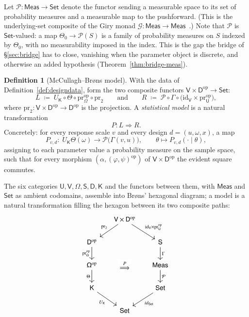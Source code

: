 \documentclass[11pt,a4paper]{article}
\theoremstyle{plain}
\theoremstyle{definition}
\newtheorem{definition}[theorem]{Definition}
\theoremstyle{remark}
\newcommand{\cat}[1]{\mathsf{#1}}
\newcommand{\catU}{\cat{U}}
\newcommand{\catV}{\cat{V}}
\newcommand{\catO}{\cat{\Omega}}
\newcommand{\catS}{\cat{S}}
\newcommand{\catD}{\cat{D}}
\newcommand{\catK}{\cat{K}}
\newcommand{\Meas}{\cat{Meas}}
\newcommand{\Set}{\cat{Set}}
\newcommand{\G}{\mathcal{G}}
\newcommand{\Prb}{\mathcal{P}}
\newcommand{\op}{\mathrm{op}}
\newcommand{\id}{\mathrm{id}}
\newcommand{\pr}{\mathrm{pr}}
\begin{document}
Let $\Prb \colon \Meas \to \Set$ denote the functor sending a measurable space
to its set of probability measures and a measurable map to the pushforward.
(This is the underlying-set composite of the Giry monad
$\G \colon \Meas \to \Meas$~\cite{giry_categorical_1982}.) Note that $\Prb$ is
$\Set$-valued: a map $\Theta_0 \to \Prb(S)$ is a family of probability
measures on $S$ indexed by $\Theta_0$, with no measurability imposed in the
index. This is the gap the bridge of \S\ref{sec:bridge} has to close,
vanishing when the parameter object is discrete, and otherwise an added
hypothesis (Theorem~\ref{thm:bridge-meas}).

\begin{definition}[McCullagh--Br\o ns model]\label{def:mcbmodel}
With the data of Definition~\ref{def:designdata}, form the two composite
functors $\catV \times \catD^{\op} \to \Set$:
\[
L \;\coloneqq\; U_{\catK} \circ \Theta \circ \pr_{\catO}^{\op}
\circ \pr_{2}
\qquad\text{and}\qquad
R \;\coloneqq\; \Prb \circ \Gamma \circ \bigl(\id_{\catV} \times \pr_{\catU}^{\op}\bigr),
\]
where $\pr_2 \colon \catV \times \catD^{\op} \to \catD^{\op}$ is the
projection. A \emph{statistical model} is a natural transformation
\[
P \colon L \Longrightarrow R.
\]
Concretely: for every response scale $v$ and every design $d = (u,\omega,x)$,
a map
\[
P_{v,d} \colon \; U_\catK\Theta(\omega) \longrightarrow \Prb\bigl(\Gamma(v,u)\bigr),
\qquad \theta \longmapsto P_{v,d}(\cdot \mid \theta),
\]
assigning to each parameter value a probability measure on the sample space,
such that for every morphism $(\alpha,(\varphi,\psi)^{\op})$ of
$\catV \times \catD^{\op}$ the evident square commutes.
\end{definition}

The six categories $\catU,\catV,\catO,\catS,\catD,\catK$ and the functors
between them, with $\Meas$ and $\Set$ as ambient codomains, assemble into
Br\o ns' hexagonal diagram; a model is a natural transformation filling the
hexagon between its two composite paths:
\[
\begin{tikzcd}[column sep=1.6em, row sep=1.9em]
& \catV \times \catD^{\op}
\arrow[dl, "\pr_2"'] \arrow[dr, "\id_\catV \times \pr_\catU^{\op}"] & \\
\catD^{\op} \arrow[d, "\pr_\catO^{\op}"'] & & \catS \arrow[d, "\Gamma"] \\
\catO^{\op} \arrow[d, "\Theta"'] \arrow[rr, phantom, "\overset{P}{\Longrightarrow}" description] & & \Meas \arrow[d, "\Prb"] \\
\catK \arrow[dr, "U_\catK"'] 
& & \Set \arrow[dl, "id_\Set"]\\
&\Set
\end{tikzcd}
\]
\end{document}
